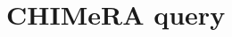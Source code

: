 \documentclass{standalone}
\begin{document}
\section[CHIMeRA query]{CHIMeRA query}\label{query:query}

\end{document}
